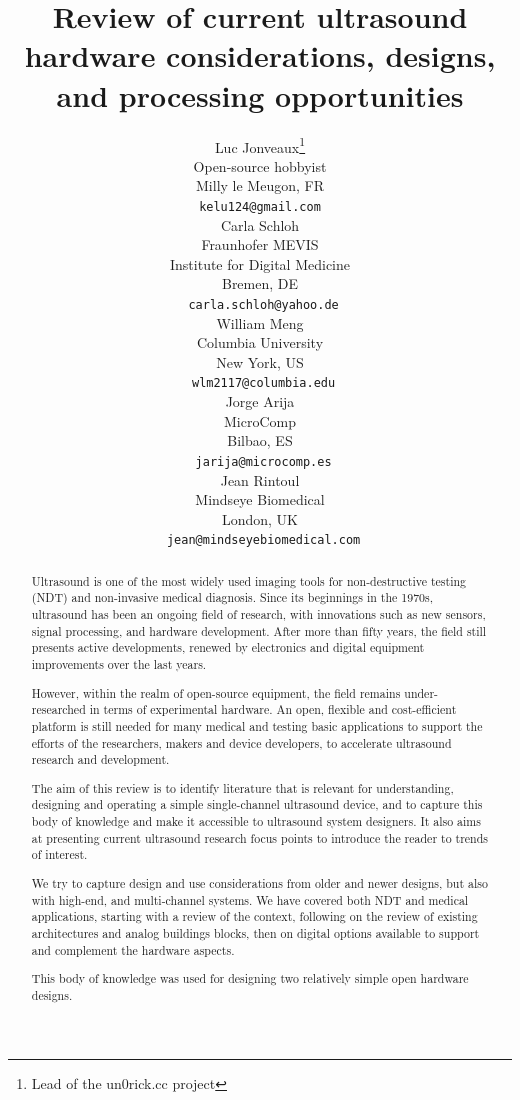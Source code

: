 \documentclass{article}
\title{Review of current ultrasound hardware considerations, designs, and processing opportunities}
\author{
 Luc Jonveaux\thanks{Lead of the un0rick.cc project } \\
 Open-source hobbyist \\
 Milly le Meugon, FR\\
 \texttt{kelu124@gmail.com} \\
 \And
 Carla Schloh \\
 Fraunhofer MEVIS\\
 Institute for Digital Medicine\\
 Bremen, DE\\
 \texttt{ carla.schloh@yahoo.de} \\
\And
 William Meng \\
Columbia University \\
 New York, US\\
 \texttt{ wlm2117@columbia.edu} \\
 \And
 Jorge Arija \\
MicroComp \\
 Bilbao, ES\\
 \texttt{ jarija@microcomp.es} \\
   \And
 Jean Rintoul \\
Mindseye Biomedical \\
 London, UK\\
 \texttt{ jean@mindseyebiomedical.com} \\
 }
\begin{document}
\maketitle

\begin{abstract}

Ultrasound is one of the most widely used imaging tools for non-destructive testing (NDT) and non-invasive medical diagnosis.
Since its beginnings in the 1970s, ultrasound has been an ongoing field of research,
with innovations such as new sensors, signal processing, and hardware development. After more than fifty years, the field still presents active developments, renewed by electronics and digital equipment improvements over the last years.

However, within the realm of open-source equipment, the field remains under-researched in terms of experimental hardware. An open, flexible and cost-efficient platform is still needed for many medical and testing basic applications to support the efforts of the researchers, makers and device developers, to accelerate ultrasound research and development.

The aim of this review is to identify literature that is relevant for understanding, designing and operating a simple single-channel ultrasound device, and to capture this body of knowledge and make it accessible to ultrasound system designers. It also aims at presenting current ultrasound research focus points to introduce the reader to trends of interest.

We try to capture design and use considerations from older and newer designs, but also with high-end, and multi-channel systems. We have covered both NDT and medical applications, starting with a review of the context, following on the review of existing architectures and analog buildings blocks, then on digital options available to support and complement the hardware aspects.

This body of knowledge was used for designing two relatively simple open hardware designs.



\end{abstract}




\newpage
\end{document}
